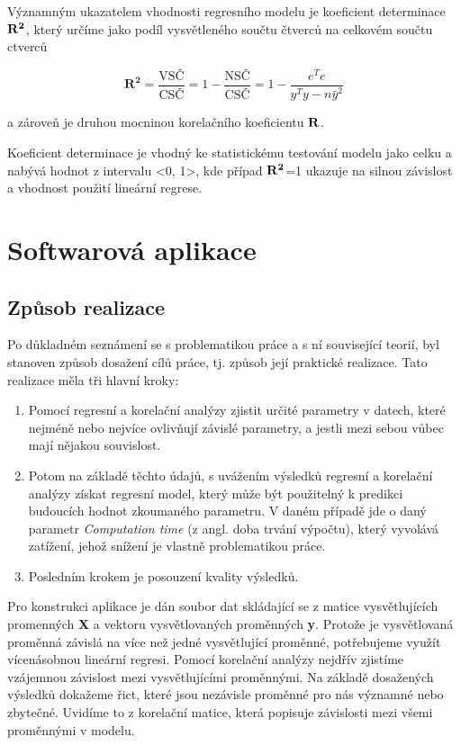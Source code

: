\documentclass[a4paper,12pt,twoside]{scrreprt}
\begin{document}
Významným ukazatelem vhodnosti regresního modelu je koeficient determinace $\bf{R^2}$, který určíme jako podíl vysvětleného součtu čtverců na celkovém součtu ctverců

\begin{equation}
\mathbf{R^2} = \frac{\text{VSČ}}{\text{CSČ}} = 1 - \frac{\text{NSČ}}{\text{CSČ}} = 1 - \frac{e^Te}{y^Ty - n\bar{y}^2}
\end{equation}

a zároveň je druhou mocninou korelačního koeficientu $\bf{R}$. 

Koeficient determinace je vhodný ke statistickému testování modelu jako celku a nabývá hodnot z intervalu <0, 1>, kde případ $\bf{R}^2$=1 ukazuje na silnou závislost a vhodnost použití lineární regrese. \cite{fiala} 


\newpage
\section{Softwarová aplikace}
\subsection{Způsob realizace}

Po důkladném seznámení se s problematikou práce a s ní související teorií, byl stanoven způsob dosažení cílů práce, tj. způsob její praktické realizace. Tato realizace měla tři hlavní kroky:

\begin{enumerate}
\item Pomocí regresní a korelační analýzy zjistit určité parametry v datech, které nejméně nebo nejvíce ovlivňují závislé parametry, a jestli mezi sebou vůbec mají nějakou souvislost. 

\item Potom na základě těchto údajů, s uvážením výsledků regresní a korelační analýzy získat regresní model, který může být použitelný k predikci budoucích hodnot zkoumaného parametru. V daném případě jde o daný parametr \textit{Computation time} (z angl. doba trvání výpočtu), který vyvolává zatížení, jehož snížení je vlastně problematikou práce.

\item Posledním krokem je posouzení kvality výsledků.	
\end{enumerate}
 
Pro konstrukci aplikace je dán soubor dat skládající se z matice vysvětlujících promenných \textbf{X} a vektoru vysvětlovaných proměnných \textbf{y}. Protože je vysvětlovaná proměnná závislá na více než jedné vysvětlující proměnné, potřebujeme využít vícenásobnou lineární regresi. Pomocí korelační analýzy nejdřív zjistíme vzájemnou závislost mezi vysvětlujícími proměnnými. Na základě dosažených výsledků dokažeme řict, které jsou nezávisle proměnné pro nás významné nebo zbytečné. Uvidíme to z korelační matice, která popisuje závislosti mezi všemi proměnnými v modelu. 
\end{document}
